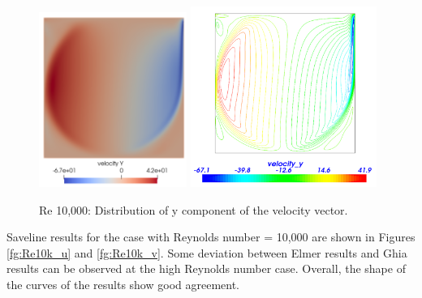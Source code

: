 \begin{figure}[H]
\centering
\includegraphics[width=0.43\textwidth]{DC_velocity_y_10k}
\includegraphics[width=0.54\textwidth]{DC_velocity_y_VTK_10k}
\caption{Re 10,000: Distribution of y component of the velocity vector.}\label{fg:DC_velocity_y_10k}
\end{figure} 

\newpage
Saveline results for the case with Reynolds number = 10,000 are shown in Figures \ref{fg:Re10k_u}
and  \ref{fg:Re10k_v}.  Some deviation between Elmer results and Ghia results can be observed
at the high Reynolds number case.  Overall, the shape of the curves of the results
show good agreement.

